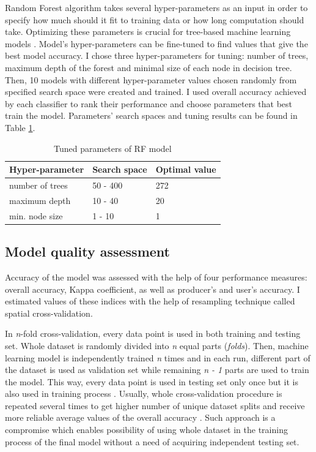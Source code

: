 \documentclass{amuthesis}
\begin{document}
Random Forest algorithm takes several hyper-parameters as an input in
order to specify how much should it fit to training data or how long
computation should take. Optimizing these parameters is crucial for
tree-based machine learning models \autocite{yang_hyperparameter_2020}.
Model's hyper-parameters can be fine-tuned to find values that give the
best model accuracy. I chose three hyper-parameters for tuning: number
of trees, maximum depth of the forest and minimal size of each node in
decision tree. Then, 10 models with different hyper-parameter values
chosen randomly from specified search space were created and trained. I
used overall accuracy achieved by each classifier to rank their
performance and choose parameters that best train the model. Parameters'
search spaces and tuning results can be found in Table
\ref{tbl-tabela3}.

\hypertarget{tbl-tabela3}{}
\begin{table}
\caption{\label{tbl-tabela3}Tuned parameters of RF model }\tabularnewline

\centering
\begin{tabular}{|>{}l|>{}l|>{}l|}
\toprule
\textbf{Hyper-parameter} & \textbf{Search space} & \textbf{Optimal value}\\
\midrule
number of trees & 50 - 400 & 272\\
\hline
maximum depth & 10 - 40 & 20\\
\hline
min. node size & 1 - 10 & 1\\
\bottomrule
\end{tabular}
\end{table}

\hypertarget{sec-resampling}{%
\subsection{Model quality assessment}\label{sec-resampling}}

Accuracy of the model was assessed with the help of four performance
measures: overall accuracy, Kappa coefficient, as well as producer's and
user's accuracy. I estimated values of these indices with the help of
resampling technique called spatial cross-validation.

In \emph{n}-fold cross-validation, every data point is used in both
training and testing set. Whole dataset is randomly divided into
\emph{n} equal parts (\emph{folds}). Then, machine learning model is
independently trained \emph{n} times and in each run, different part of
the dataset is used as validation set while remaining \emph{n - 1} parts
are used to train the model. This way, every data point is used in
testing set only once but it is also used in training process
\autocite{jiao_performance_2016}. Usually, whole cross-validation
procedure is repeated several times to get higher number of unique
dataset splits and receive more reliable average values of the overall
accuracy \autocite{varga_validation_2021}. Such approach is a compromise
which enables possibility of using whole dataset in the training process
of the final model without a need of acquiring independent testing set.
\end{document}
